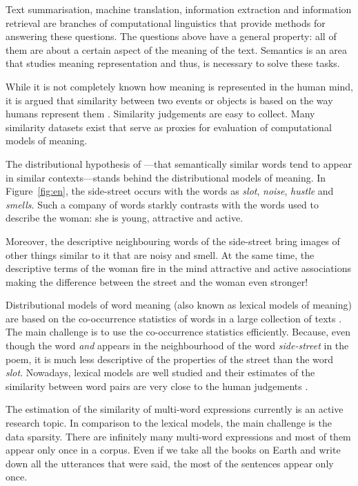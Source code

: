 Text summarisation, machine translation, information extraction and information retrieval are branches of computational linguistics that provide methods for answering these questions. The questions above have a general property: all of them are about a certain aspect of the meaning of the text. Semantics is an area that studies meaning representation and thus, is necessary to solve these tasks.

While it is not completely known how meaning is represented in the human mind, it is argued that similarity between two events or objects is based on the way humans represent them \cite{WCS:WCS1282}. Similarity judgements are easy to collect. Many similarity datasets exist that serve as proxies for evaluation of computational models of meaning.

The distributional hypothesis of \citet{harris1954distributional}---that semantically similar words tend to appear in similar contexts---stands behind the distributional models of meaning. In Figure~\ref{fig:en}, the side-street occurs with the words as \textit{slot}, \textit{noise}, \textit{hustle} and \textit{smells}. Such a company of words starkly contrasts with the words used to describe the woman: she is young, attractive and active.

Moreover, the descriptive neighbouring words of the side-street bring images of other things similar to it that are noisy and smell. At the same time, the descriptive terms of the woman fire in the mind attractive and active associations making the difference between the street and the woman even stronger!

Distributional models of word meaning (also known as lexical models of meaning) are based on the co-occurrence statistics of words in a large collection of texts \cite{Turney:2010:FMV:1861751.1861756,mikolov2013linguistic,mikolov2013distributed,mikolov2013efficient}. The main challenge is to use the co-occurrence statistics efficiently. Because, even though the word \textit{and} appears in the neighbourhood of the word \textit{side-street} in the poem, it is much less descriptive of the properties of the street than the word \textit{slot}. Nowadays, lexical models are well studied and their estimates of the similarity between word pairs are very close to the human judgements \cite{TACL570,baroni-dinu-kruszewski:2014:P14-1,Halawi:2012:LLW:2339530.2339751}.

The estimation of the similarity of multi-word expressions currently is an active research topic. In comparison to the lexical models, the main challenge is the data sparsity. There are infinitely many multi-word expressions and most of them appear only once in a corpus. Even if we take all the books on Earth and write down all the utterances that were said, the most of the sentences appear only once.

